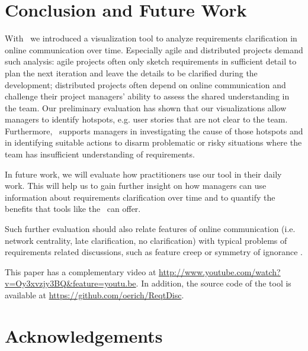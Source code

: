 \section{Conclusion and Future Work}
With \viss\ we introduced a visualization tool to analyze requirements clarification in online communication over time.
Especially agile and distributed projects demand such analysis: agile projects often only sketch requirements in sufficient detail to plan the next iteration and leave the details to be clarified during the development; distributed projects often depend on online communication and challenge their project managers' ability to assess the shared understanding in the team. 
Our preliminary evaluation has shown that our visualizations allow managers to identify hotspots, e.g. user stories that are not clear to the team. 
Furthermore, \viss\ supports managers in investigating the cause of those hotspots and in identifying suitable actions to disarm problematic or risky situations where the team has insufficient understanding of requirements.
 
In future work, we will evaluate how practitioners use our tool in their daily work. 
This will help us to gain further insight on how managers can use information about requirements clarification over time and to quantify the benefits that tools like the \viss\ can offer.

Such further evaluation should also relate features of online communication (i.e. network centrality, late clarification, no clarification) with typical problems of requirements related discussions, such as feature creep \cite{Jones1996} or symmetry of ignorance \cite{Fischer2000}.

This paper has a complementary video at \url{http://www.youtube.com/watch?v=Oy3xvzjy3BQ&feature=youtu.be}. In addition, the source code of the tool is available at \url{https://github.com/oerich/ReqtDisc}.
\section*{Acknowledgements}
